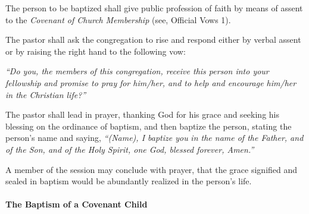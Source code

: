 \begin{outerlst}[left=0pt,labelsep=0pt]
\begin{innerlst}[resume*]
      \item The person to be baptized shall give public profession of faith by means of assent to the \textit{Covenant of Church}\textit{ Membership} (see, Official Vows 1). 
      \item The pastor shall ask the congregation to rise and respond either by verbal assent or by raising the right hand to the following vow: 
\end{innerlst}
\textit{{``Do you, the members}}\textit{ of this congregation, receive this person into your fellowship}\textit{ and promise to pray}\textit{ for him/her, and to help and encourage him/her in the Christian life?''}   

\begin{innerlst}[resume*]
      \item The pastor shall lead in prayer, thanking God for his grace and seeking his blessing on the ordinance of baptism, and then baptize the person, stating the person's name and saying, \textit{{``(Name), I baptize you}}\textit{ in the name of the Father, and of the Son}\textit{, and of the Holy Spirit}\textit{, one God, blessed forever, Amen.''} 
      \item A member of the session may conclude with prayer, that the grace signified and sealed in baptism would be abundantly realized in the person's life. 
\end{innerlst} 

\paragraph[The Baptism of a Covenant Child]{The Baptism of a Covenant Child}  


\end{outerlst}
